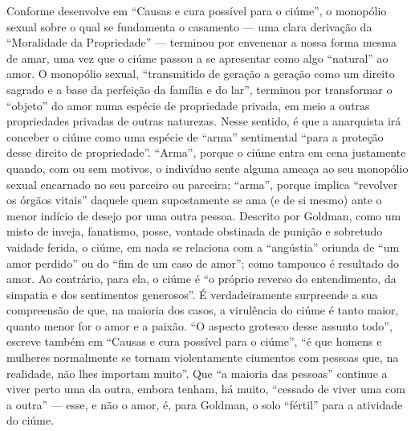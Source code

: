 Conforme desenvolve em ``Causas e cura possível para o ciúme'', o
monopólio sexual sobre o qual se fundamenta o casamento --- uma clara
derivação da ``Moralidade da Propriedade'' --- terminou por envenenar a
nossa forma mesma de amar, uma vez que o ciúme passou a se apresentar
como algo ``natural'' ao amor. O monopólio sexual, ``transmitido de
geração a geração como um direito sagrado e a base da perfeição da
família e do lar'', terminou por transformar o ``objeto'' do amor numa
espécie de propriedade privada, em meio a outras propriedades privadas
de outras naturezas. Nesse sentido, é que a anarquista irá conceber o
ciúme como uma espécie de ``arma'' sentimental ``para a proteção desse
direito de propriedade''. ``Arma'', porque o ciúme entra em cena
justamente quando, com ou sem motivos, o indivíduo sente alguma ameaça
ao seu monopólio sexual encarnado no seu parceiro ou parceira; ``arma'',
porque implica ``revolver os órgãos vitais'' daquele quem supostamente
se ama (e de si mesmo) ante o menor indício de desejo por uma outra
pessoa. Descrito por Goldman, como um misto de inveja, fanatismo, posse,
vontade obstinada de punição e sobretudo vaidade ferida, o ciúme, em
nada se relaciona com a ``angústia'' oriunda de ``um amor perdido'' ou
do ``fim de um caso de amor''; como tampouco é resultado do amor. Ao
contrário, para ela, o ciúme é ``o próprio reverso do entendimento, da
simpatia e dos sentimentos generosos''. É verdadeiramente surpreende a
sua compreensão de que, na maioria dos casos, a virulência do ciúme é
tanto maior, quanto menor for o amor e a paixão. ``O aspecto grotesco
desse assunto todo'', escreve também em ``Causas e cura possível para o
ciúme'', ``é que homens e mulheres normalmente se tornam violentamente
ciumentos com pessoas que, na realidade, não lhes importam muito''. Que
``a maioria das pessoas'' continue a viver perto uma da outra, embora
tenham, há muito, ``cessado de viver uma com a outra'' --- esse, e não o
amor, é, para Goldman, o solo ``fértil'' para a atividade do ciúme.

